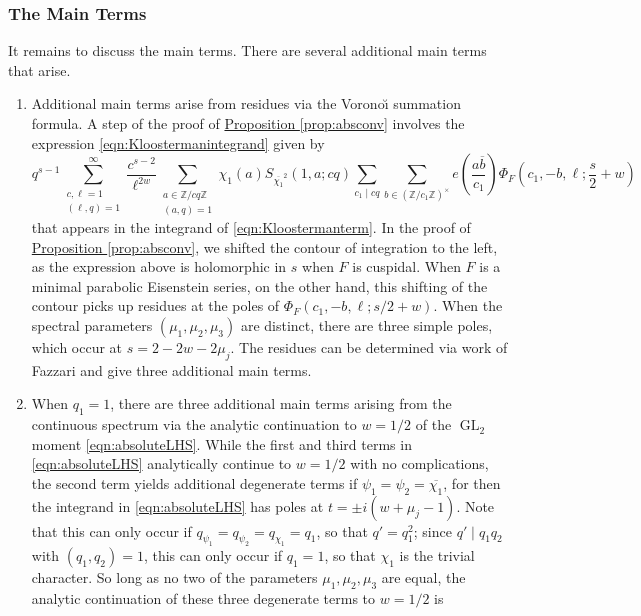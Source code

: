 \documentclass[11pt,a4paper]{amsart}
\newcommand{\Z}{\mathbb{Z}}
\DeclareMathOperator{\GL}{GL}
\numberwithin{equation}{section}
\theoremstyle{remark}
\theoremstyle{definition}
\begin{document}
\subsubsection{The Main Terms}

It remains to discuss the main terms. There are several additional main terms that arise.

\begin{enumerate}[leftmargin=*,label=\textup{(\arabic*)}]
\item Additional main terms arise from residues via the Vorono\u{\i} summation formula. A step of the proof of \hyperref[prop:absconv]{Proposition \ref*{prop:absconv}} involves the expression \eqref{eqn:Kloostermanintegrand} given by
\[q^{s - 1} \sum_{\substack{c,\ell = 1 \\ (\ell,q) = 1}}^{\infty} \frac{c^{s - 2}}{\ell^{2w}} \sum_{\substack{a \in \Z/cq\Z \\ (a,q) = 1}} \chi_1(a) S_{\overline{\chi_1}^2}(1,a;cq) \sum_{c_1 \mid cq} \sum_{b \in (\Z/c_1\Z)^{\times}} e\left(\frac{a\overline{b}}{c_1}\right) \Phi_F\left(c_1,-b,\ell;\frac{s}{2} + w\right)\]
that appears in the integrand of \eqref{eqn:Kloostermanterm}. In the proof of \hyperref[prop:absconv]{Proposition \ref*{prop:absconv}}, we shifted the contour of integration to the left, as the expression above is holomorphic in $s$ when $F$ is cuspidal. When $F$ is a minimal parabolic Eisenstein series, on the other hand, this shifting of the contour picks up residues at the poles of $\Phi_F(c_1,-b,\ell;s/2 + w)$. When the spectral parameters $(\mu_1,\mu_2,\mu_3)$ are distinct, there are three simple poles, which occur at $s = 2 - 2w - 2\mu_j$. The residues can be determined via work of Fazzari \cite{Faz24} and give three additional main terms.
\item When $q_1 = 1$, there are three additional main terms arising from the continuous spectrum via the analytic continuation to $w = 1/2$ of the $\GL_2$ moment \eqref{eqn:absoluteLHS}. While the first and third terms in \eqref{eqn:absoluteLHS} analytically continue to $w = 1/2$ with no complications, the second term yields additional degenerate terms if $\psi_1 = \psi_2 = \overline{\chi_1}$, for then the integrand in \eqref{eqn:absoluteLHS} has poles at $t = \pm i(w + \mu_j - 1)$. Note that this can only occur if $q_{\psi_1} = q_{\psi_2} = q_{\chi_1} = q_1$, so that $q' = q_1^2$; since $q' \mid q_1 q_2$ with $(q_1,q_2) = 1$, this can only occur if $q_1 = 1$, so that $\chi_1$ is the trivial character. So long as no two of the parameters $\mu_1,\mu_2,\mu_3$ are equal, the analytic continuation of these three degenerate terms to $w = 1/2$ is

\end{enumerate}
\end{document}

